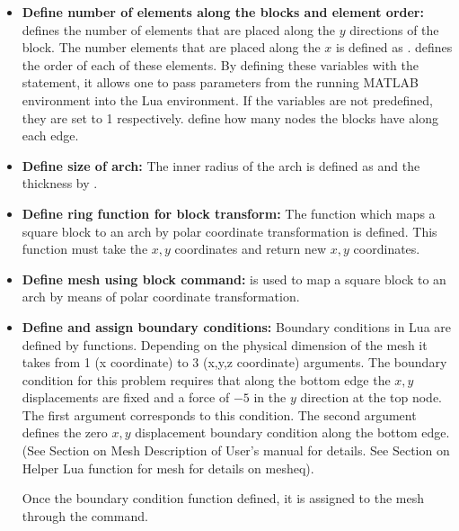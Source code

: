 \clearpage
\begin{itemize}

  \item{\textbf{Define number of elements along the blocks and element order:}}
   defines the number of elements that are placed along
  the $y$ directions of the block. The number elements that are placed
  along the $x$ is defined as .
   defines the order of each of these elements. By defining
  these variables with the  statement, it allows one to pass
  parameters from the running MATLAB environment into the Lua environment.
  If the variables  are not predefined, they are 
  set to 1 respectively.  define how many nodes the 
  blocks have along each edge. 

  \item{\textbf{Define size of arch:}}
  The inner radius of the arch is defined as  and the thickness
  by .

  \item{\textbf{Define ring function for block transform:}}
  The function  which maps a square block to an arch by
  polar coordinate transformation is defined. This function must take
  the $x,y$ coordinates and return new $x,y$ coordinates.

  \item{\textbf{Define mesh using block command:}}
   is used to map a square
  block to an arch by means of polar coordinate transformation.

  \item{\textbf{Define and assign boundary conditions:}}  
  Boundary conditions in Lua are defined by functions. Depending
  on the physical dimension of the mesh it takes from 1 (x coordinate)
  to 3 (x,y,z coordinate) arguments. The boundary condition for
  this problem requires that along the bottom edge the $x,y$ displacements
  are fixed and a force of $-5$ in the $y$ direction at the top node.
  The first  argument corresponds to this condition. 
  The second  argument
  defines the zero $x,y$ displacement boundary condition along the 
  bottom edge.
  (See Section on Mesh Description of
  User's manual for details. See Section on Helper Lua function for
  mesh for details on mesheq).

  Once the boundary condition function defined, it is assigned 
  to the mesh through the  command.

\end{itemize}

